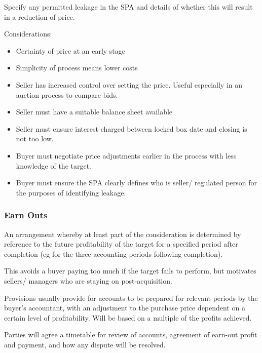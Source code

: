 \documentclass[
]{article}
\newenvironment{Shaded}{}{}
\newcommand{\NormalTok}[1]{#1}
\providecommand{\tightlist}{%
  \setlength{\itemsep}{0pt}\setlength{\parskip}{0pt}}
\begin{document}
Specify any permitted leakage in the SPA and details of whether this
will result in a reduction of price.

Considerations:

\begin{itemize}
\tightlist
\item
  Certainty of price at an early stage
\item
  Simplicity of process means lower costs
\item
  Seller has increased control over setting the price. Useful especially
  in an auction process to compare bids.
\item
  Seller must have a suitable balance sheet available
\item
  Seller must ensure interest charged between locked box date and
  closing is not too low.
\item
  Buyer must negotiate price adjustments earlier in the process with
  less knowledge of the target.
\item
  Buyer must ensure the SPA clearly defines who is seller/ regulated
  person for the purposes of identifying leakage.
\end{itemize}

\hypertarget{earn-outs}{%
\subsubsection{Earn Outs}\label{earn-outs}}

\begin{Shaded}
\begin{Highlighting}[]
\NormalTok{An arrangement whereby at least part of the consideration is determined by reference to the future profitability of the target for a specified period after completion (eg for the three accounting periods following completion).}
\end{Highlighting}
\end{Shaded}

This avoids a buyer paying too much if the target fails to perform, but
motivates sellers/ managers who are staying on post-acquisition.

Provisions usually provide for accounts to be prepared for relevant
periods by the buyer's accountant, with an adjustment to the purchase
price dependent on a certain level of profitability. Will be based on a
multiple of the profits achieved.

Parties will agree a timetable for review of accounts, agreement of
earn-out profit and payment, and how any dispute will be resolved.
\end{document}
